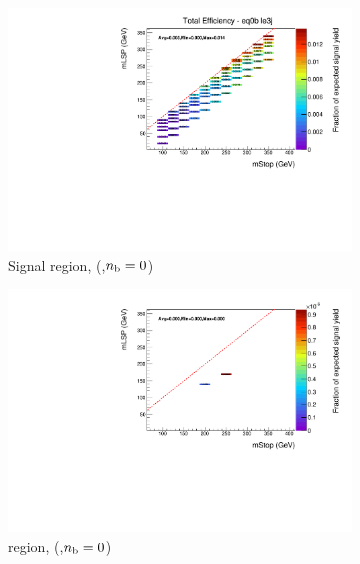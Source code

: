 \begin{figure}[p]
  \centering
  \begin{subfigure}[b]{0.47\textwidth}
    \includegraphics[width=\textwidth]{Figs/sms/t2cc/v37/effs/T2cc_had_eff_maps_eq0b_le3j_SITV.pdf}
    \caption{Signal region, (\njlow,$n_{\text{b}}=0$)}
    \label{fig:t2cc_sig_eff_le3j_0b}
  \end{subfigure}
  \begin{subfigure}[b]{0.47\textwidth}
    \includegraphics[width=\textwidth]{Figs/sms/t2cc/v37/effs/T2cc_muon_eff_maps_eq0b_le3j_SITV.pdf}
    \caption{\mj region, (\njlow,$n_{\text{b}}=0$)}
    \label{fig:t2cc_mu_eff_le3j_0b}
  \end{subfigure} \\
  \begin{subfigure}[b]{0.47\textwidth}

\end{subfigure}
\end{figure}
